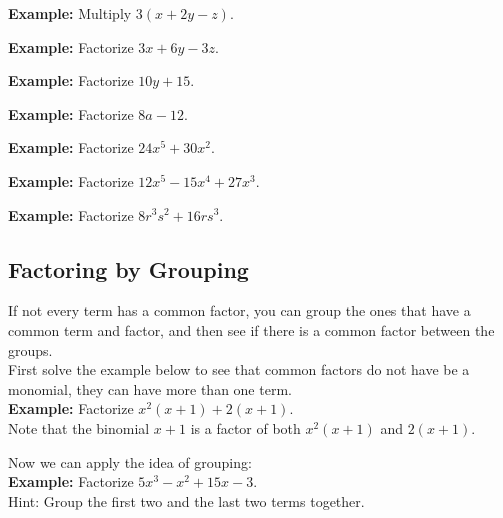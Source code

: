 \documentclass{ximera}
\begin{document}
{\bf Example:} Multiply $3(x + 2y -z)$.\\
\vspace{2 cm}

{\bf Example:} Factorize $3x + 6y -3z $.\\
\vspace{2 cm}

{\bf Example:} Factorize $10y + 15 $.\\
\vspace{2 cm}

{\bf Example:} Factorize $8a -12$.\\
\vspace{2 cm}

{\bf Example:} Factorize $24 x^5 + 30 x^2$.\\
\vspace{2 cm}

{\bf Example:} Factorize $12 x^5 - 15 x^4 + 27 x^3$.\\
\vspace{2 cm}

{\bf Example:} Factorize $8r^3s^2 + 16 r s^3$.\\
\vspace{2 cm}

\subsection{Factoring by Grouping}

If not every term has a common factor, you can group the ones that have a common term and factor, and then see if there is a common factor between the groups. \\

First solve the example below to see that common factors do not have be a monomial, they can have more than one term.\\

{\bf Example:} Factorize $x^2(x+1) + 2(x+1)$.\\

Note that the binomial $x+1$ is a factor of both $x^2(x+1)$ and $2(x+1)$.\\
\vspace{2 cm}

Now we can apply the idea of grouping:\\

{\bf Example:} Factorize $5x^3 - x^2 + 15x -3$.\\

Hint: Group the first two and the last two terms together.\\
\vspace{3 cm}
\end{document}
